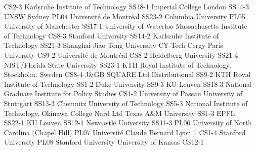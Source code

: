 \begin{multicols}{2}
{CS2-3}
{}
{ Karlsruhe Institute of Technology }
{SS18-1}
{}
{ Imperial College London }
{SS14-3}
{}
{ UNSW Sydney }
{PL04}
{}
{ Université de Montréal }
{SS23-2}
{}
{ Columbia University }
{PL05}
{}
{ University of Manchester }
{SS17-1}
{}
{ University of Waterloo }
{}
{}
{ Massachusetts Institute of Technology }
{CS8-3}
{}
{ Stanford University }
{SS14-2}
{}
{ Karlsruhe Institute of Technology }
{SS21-3}
{}
{ Shanghai Jiao Tong University }
{}
{}
{ CY Tech Cergy Paris University }
{CS9-2}
{}
{ Université de Montréal }
{CS8-2}
{}
{ Heidelberg University }
{SS21-4}
{}
{ NIST/Florida State University }
{SS23-1}
{}
{ KTH Royal Institute of Technology, Stockholm, Sweden }
{CS8-4}
{}
{ J\&GB SQUARE Ltd }
{}
{}
{ Distributional }
{SS9-2}
{}
{ KTH Royal Institute of Technology }
{SS1-2}
{}
{ Duke University }
{SS9-3}
{}
{ KU Leuven }
{SS18-3}
{}
{ National Graduate Institute for Policy Studies }
{CS1-2}
{}
{}
{}
{ University of Passau }
{}
{}
{ University of Stuttgart }
{SS13-3}
{}
{ Chemnitz University of Technology }
{SS5-3}
{}
{ National Institute of Technology, Okinawa College }
{}
{}
{ Nard Ltd }
{}
{}
{ Texas A\&M University }
{SS1-3}
{}
{ EPFL }
{SS22-1}
{}
{ KU Leuven }
{SS12-1}
{}
{ Newcastle University }
{SS11-3}
{PL06}
{ University of North Carolina (Chapel Hill) }
{PL07}
{}
{ Université Claude Bernard Lyon 1 }
{CS1-4}
{}
{ Stanford University }
{PL08}
{}
{ Stanford University }
{}
{}
{ University of Kansas }
{CS12-1}
{}

\end{multicols}
